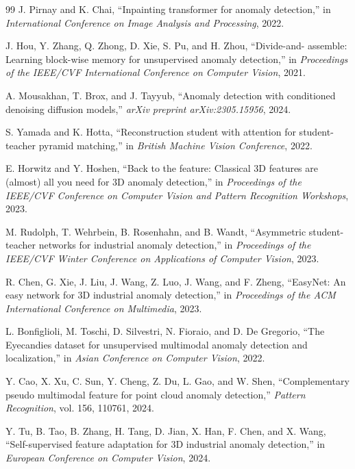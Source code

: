 \documentclass[10pt,conference]{IEEEtran}
\begin{document}
\begin{thebibliography}{99}
J. Pirnay and K. Chai, ``Inpainting transformer for anomaly detection,''
in \emph{International Conference on Image Analysis and Processing}, 2022.

J. Hou, Y. Zhang, Q. Zhong, D. Xie, S. Pu, and H. Zhou, ``Divide-and-
assemble: Learning block-wise memory for unsupervised anomaly detection,''
in \emph{Proceedings of the IEEE/CVF International Conference on Computer
Vision}, 2021.

A. Mousakhan, T. Brox, and J. Tayyub, ``Anomaly detection with conditioned
denoising diffusion models,'' \emph{arXiv preprint arXiv:2305.15956}, 2024.

S. Yamada and K. Hotta, ``Reconstruction student with attention for
student-teacher pyramid matching,'' in \emph{British Machine Vision
Conference}, 2022.

E. Horwitz and Y. Hoshen, ``Back to the feature: Classical 3D features are
(almost) all you need for 3D anomaly detection,'' in \emph{Proceedings of
the IEEE/CVF Conference on Computer Vision and Pattern Recognition
Workshops}, 2023.

M. Rudolph, T. Wehrbein, B. Rosenhahn, and B. Wandt, ``Asymmetric student-
teacher networks for industrial anomaly detection,'' in \emph{Proceedings
of the IEEE/CVF Winter Conference on Applications of Computer Vision},
2023.

R. Chen, G. Xie, J. Liu, J. Wang, Z. Luo, J. Wang, and F. Zheng,
``EasyNet: An easy network for 3D industrial anomaly detection,'' in
\emph{Proceedings of the ACM International Conference on Multimedia}, 2023.

L. Bonfiglioli, M. Toschi, D. Silvestri, N. Fioraio, and D. De Gregorio,
``The Eyecandies dataset for unsupervised multimodal anomaly detection and
localization,'' in \emph{Asian Conference on Computer Vision}, 2022.

Y. Cao, X. Xu, C. Sun, Y. Cheng, Z. Du, L. Gao, and W. Shen, ``Complementary
pseudo multimodal feature for point cloud anomaly detection,''
\emph{Pattern Recognition}, vol. 156, 110761, 2024.

Y. Tu, B. Tao, B. Zhang, H. Tang, D. Jian, X. Han, F. Chen, and X. Wang,
``Self-supervised feature adaptation for 3D industrial anomaly detection,''
in \emph{European Conference on Computer Vision}, 2024.


\end{thebibliography}
\end{document}
